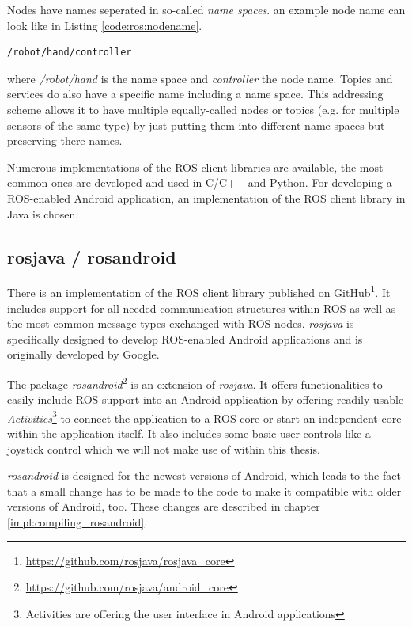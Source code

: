 Nodes have names seperated in so-called \textit{name spaces}. an example node name can look like in Listing \ref{code:ros:nodename}.
\begin{lstlisting}[caption={An example ROS node name},label=code:ros:nodename]
/robot/hand/controller
\end{lstlisting}


where \textit{/robot/hand} is the name space and \textit{controller} the node name. Topics and services do also have a specific name including a name space. This addressing scheme allows it to have multiple equally-called nodes or topics (e.g. for multiple sensors of the same type) by just putting them into different name spaces but preserving there names.

Numerous implementations of the ROS client libraries are available, the most common ones are developed and used in C/C++ and Python\cite{ros:client_libraries}. For developing a ROS-enabled Android application, an implementation of the ROS client library in Java is chosen. 

\subsection{rosjava / rosandroid}

There is an implementation of the ROS client library published on GitHub\footnote{\url{https://github.com/rosjava/rosjava_core}}. It includes support for all needed communication structures within ROS as well as the most common message types exchanged with ROS nodes. \textit{rosjava} is specifically designed to develop ROS-enabled Android applications and is originally developed by Google\cite{ros:rosjava:readme}.

The package \textit{rosandroid}\footnote{\url{https://github.com/rosjava/android_core}} is an extension of \textit{rosjava}. It offers functionalities to easily include ROS support into an Android application by offering readily usable \textit{Activities}\footnote{Activities are offering the user interface in Android applications} to connect the application to a ROS core or start an independent core within the application itself. It also includes some basic user controls like a joystick control which we will not make use of within this thesis.

\textit{rosandroid} is designed for the newest versions of Android, which leads to the fact that a small change has to be made to the code to make it compatible with older versions of Android, too. These changes are described in chapter \ref{impl:compiling_rosandroid}.


